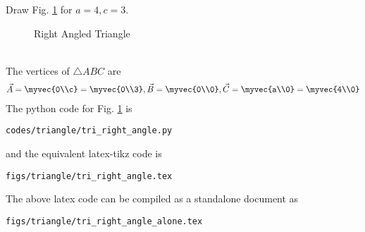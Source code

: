 %
\item Draw Fig. \ref{fig:tri_right_angle} for $a = 4, c =3$.
\label{const:tri_right_angle}
%
\begin{figure}[!ht]
\centering
\resizebox{\columnwidth}{!}{}
\caption{Right Angled Triangle}
\label{fig:tri_right_angle}	
\end{figure}
\\
\solution The vertices of $\triangle ABC$ are 
\begin{align}
\vec{A} = \myvec{0\\c} = \myvec{0\\3}, \vec{B} = \myvec{0\\0}, \vec{C} = \myvec{a\\0}=\myvec{4\\0}
\end{align}
%
The python code for  Fig. \ref{fig:tri_right_angle} is
\begin{lstlisting}
codes/triangle/tri_right_angle.py
\end{lstlisting}
%
and the equivalent latex-tikz code is
%
\begin{lstlisting}
figs/triangle/tri_right_angle.tex
\end{lstlisting}
%
The above latex code can be compiled as a standalone document as
%
\begin{lstlisting}
figs/triangle/tri_right_angle_alone.tex
\end{lstlisting}
%

